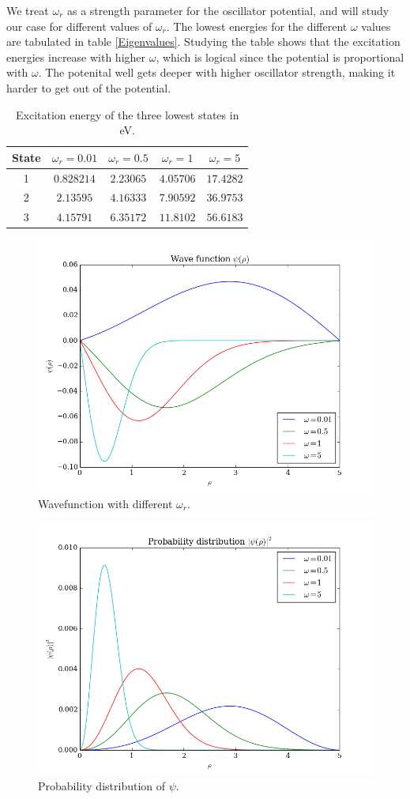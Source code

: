 \documentclass{aa}   %
\begin{document}
We treat $\omega_r$ as a strength parameter for the oscillator potential, and will study our case for different values of $\omega_r$. The lowest energies for the different $\omega$ values are tabulated in table \ref{Eigenvalues}. Studying the table shows that the excitation energies increase with higher $\omega$, which is logical since the potential is proportional with $\omega$. The potenital well gets deeper with higher oscillator strength, making it harder to get out of the potential.

\begin{table}
\begin{center}
\begin{tabular}{| c | c | c | c | c |}
\hline
State & $\omega_r = 0.01$ & $\omega_r = 0.5$ & $\omega_r = 1$ & $\omega_r = 5$\\
\hline
1 & $0.828214$ & $2.23065$& $4.05706$ & $17.4282$\\
\hline
2 & $2.13595$ & $4.16333$& $7.90592$ & $36.9753$\\
\hline
3 & $4.15791$ & $6.35172$& $11.8102$ & $56.6183$\\
\hline
\end{tabular}
\end{center}
\caption{Excitation energy of the three lowest states in eV.}
\end{table}\label{Eigenvalues}

\begin{center}
\begin{figure}
 \includegraphics[width=.49\textwidth]{wave_func.png}

\caption{Wavefunction with different $\omega_r$.}
 \end{figure}
\end{center}\label{wave_func}


\begin{center}
\begin{figure}
 \includegraphics[width=.49\textwidth]{probability_func.png}

\caption{Probability distribution of $\psi$.}
 \end{figure}
\end{center}\label{probability_func}
\end{document}
